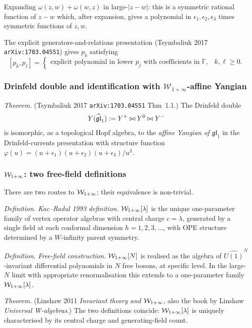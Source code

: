 Expanding $\omega(z, w) + \omega(w, z)$ in large-$|z - w|$:
this is a symmetric rational function of $z - w$ which, after expansion, gives a
polynomial in $\epsilon_1, \epsilon_2, \epsilon_3$ times symmetric functions of $z, w$.

The explicit generators-and-relations presentation (Tsymbaliuk 2017
\texttt{arXiv:1703.04551}) gives $p_k$ satisfying
\[
[p_k, p_\ell] = \begin{cases}
\text{explicit polynomial in lower } p_j \text{ with coefficients in } \mathbb{F}, & k, \ell \geq 0.
\end{cases}
\]

\subsubsection{Drinfeld double and identification with $\mathcal{W}_{1+\infty}$-affine Yangian}

\emph{Theorem.} (Tsymbaliuk 2017 \texttt{arXiv:1703.04551} Thm~1.1.)
The Drinfeld double
\[
Y(\widehat{\mathfrak{gl}}_1) := Y^+ \bowtie Y^0 \bowtie Y^-
\]
is isomorphic, as a topological Hopf algebra, to the \emph{affine Yangian of
$\mathfrak{gl}_1$} in the Drinfeld-currents presentation with structure function
$\varphi(u) = (u + \epsilon_1)(u + \epsilon_2)(u + \epsilon_3)/u^3$.

\subsubsection{$\mathcal{W}_{1+\infty}$: two free-field definitions}

There are two routes to $\mathcal{W}_{1+\infty}$; their equivalence is non-trivial.

\emph{Definition.} \emph{Kac--Radul 1993 definition.}
$\mathcal{W}_{1+\infty}[\lambda]$ is the unique one-parameter family of vertex operator algebras with
central charge $c = \lambda$, generated by a single field at each conformal dimension
$h = 1, 2, 3, \ldots$, with OPE structure determined by a $W$-infinity parent symmetry.

\emph{Definition.} \emph{Free-field construction.}
$\mathcal{W}_{1+\infty}[N]$ is realised as the algebra of $\widehat{U(1)}^N$-invariant differential polynomials
in $N$ free bosons, at specific level. In the large-$N$ limit with appropriate
renormalisation this extends to a one-parameter family $\mathcal{W}_{1+\infty}[\lambda]$.

\emph{Theorem.} (Linshaw 2011 \emph{Invariant theory and $\mathcal{W}_{1+\infty}$}, also the
book by Linshaw \emph{Universal W-algebras}.)
The two definitions coincide: $\mathcal{W}_{1+\infty}[\lambda]$ is uniquely characterised by its
central charge and generating-field count.

